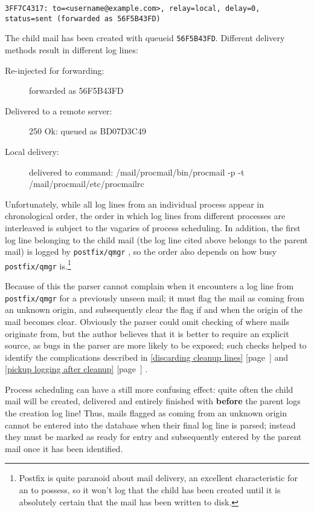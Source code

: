 \documentclass[a4paper,12pt,draft]{article}
\newcommand{\refwithpage}[1]{%
    \empty{}\ref{#1} [page~\pageref{#1}]%
}
\newcommand{\sectionref}[1]{%
    \textsection{}\refwithpage{#1}%
}
\newcommand{\daemon}[1]{%
    \texttt{postfix/#1}%
}
\begin{document}
\texttt{3FF7C4317: to=<username@example.com>, relay=local, \newline
delay=0, status=sent (forwarded as 56F5B43FD)}

The child mail has been created with queueid \texttt{56F5B43FD}.  Different
delivery methods result in different log lines:

\begin{description}

    \item [Re-injected for forwarding:] forwarded as 56F5B43FD

    \item [Delivered to a remote \SMTP{} server:] 250 Ok: queued as
        BD07D3C49

    \item [Local delivery:] delivered to command:
        /mail/procmail/bin/procmail -p -t /mail/procmail/etc/procmailrc

\end{description}

Unfortunately, while all log lines from an individual process appear in
chronological order, the order in which log lines from different processes
are interleaved is subject to the vagaries of process scheduling.  In
addition, the first log line belonging to the child mail (the log line
cited above belongs to the parent mail) is logged by \daemon{qmgr}, so the
order also depends on how busy \daemon{qmgr} is.\footnote{Postfix is quite
paranoid about mail delivery, an excellent characteristic for an \MTA{} to
possess, so it won't log that the child has been created until it is
absolutely certain that the mail has been written to disk.}

Because of this the parser cannot complain when it encounters a log line
from \daemon{qmgr} for a previously unseen mail; it must flag the mail as
coming from an unknown origin, and subsequently clear the flag if and when
the origin of the mail becomes clear.  Obviously the parser could omit
checking of where mails originate from, but the author believes that it is
better to require an explicit source, as bugs in the parser are more likely
to be exposed; such checks helped to identify the complications described
in \sectionref{discarding cleanup lines} and \sectionref{pickup logging
after cleanup}.

Process scheduling can have a still more confusing effect: quite often the
child mail will be created, delivered and entirely finished with
\textbf{before} the parent logs the creation log line!  Thus, mails flagged
as coming from an unknown origin cannot be entered into the database when
their final log line is parsed; instead they must be marked as ready for
entry and subsequently entered by the parent mail once it has been
identified.
\end{document}
